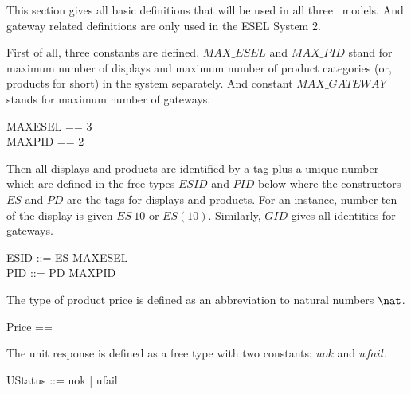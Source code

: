 
This section gives all basic definitions that will be used in all three \Circus\ models. And gateway related definitions are only used in the ESEL System 2.

First of all, three constants are defined. $MAX\_ESEL$ and $MAX\_PID$ stand for maximum number of displays and maximum number of product categories (or, products for short) in the system separately. And constant $MAX\_GATEWAY$ stands for maximum number of gateways.
\begin{zed}
    MAXESEL == 3 \\
\also    MAXPID == 2
\end{zed}

Then all displays and products are identified by a tag plus a unique number which are defined in the free types $ESID$ and $PID$ below where the constructors $ES$ and $PD$ are the tags for displays and products. For an instance, number ten of the display is given $ES~10$ or $ES(10)$. Similarly, $GID$ gives all identities for gateways.
\begin{zed}
    ESID ::= ES  \upto MAXESEL \rdata \\
    PID ::= PD  \upto MAXPID \rdata \\
\end{zed}


The type of product price is defined as an abbreviation to natural numbers $\nat$.
\begin{zed}
    Price == \nat
\end{zed}

The unit response is defined as a free type with two constants: $uok$ and $ufail$.
\begin{zed}
    UStatus ::= uok | ufail
\end{zed}

